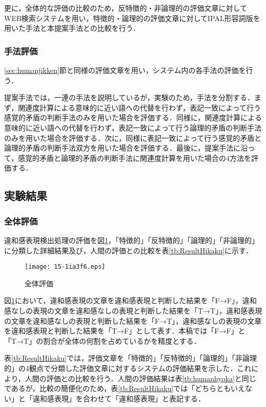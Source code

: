 \documentclass[japanese]{jnlp_1.4}
\begin{document}
更に，全体的な評価の比較のため，反特徴的・非論理的の評価文章に対してWEB検索システムを用い，特徴的・論理的の評価文章に対してIPAL形容詞版を用いた手法と本提案手法との比較を行う．

\subsubsection{手法評価}

\ref{sec:humanjikken}節と同様の評価文章を用い，システム内の各手法の評価を行う．

提案手法では，一連の手法を説明しているが，実験のため，手法を分割する．まず，関連度計算による意味的に近い語への代替を行わず，表記一致によって行う感覚的矛盾の判断手法のみを用いた場合を評価する．同様に，関連度計算による意味的に近い語への代替を行わず，表記一致によって行う論理的矛盾の判断手法のみを用いた場合を評価する．次に，同様に表記一致によって行う感覚的矛盾と論理的矛盾の判断手法双方を用いた場合を評価する．最後に，提案手法に沿って，感覚的矛盾と論理的矛盾の判断手法に関連度計算を用いた場合の4方法を評価する． 

\subsection{実験結果} \label{HyokaKekka}

\subsubsection{全体評価} \label{sec:allHyoka}

違和感表現検出処理の評価を図\ref{fig:Result}，「特徴的」「反特徴的」「論理的」「非論理的」に分類した詳細結果及び，人間の評価との比較を表\ref{tb:ResultHikaku}に示す．

\begin{figure}[b]
	\begin{center}
    \texttt{[image: 15-1ia3f6.eps]}
		\caption{全体評価}
		\label{fig:Result}
	\end{center}
\end{figure}

図\ref{fig:Result}において，違和感表現の文章を違和感表現と判断した結果を「F→F」，違和感なしの表現の文章を違和感なしの表現と判断した結果を「T→T」，違和感表現の文章を違和感なしの表現と判断した結果を「F→T」，違和感なしの表現の文章を違和感表現と判断した結果を「T→F」として表す．本稿では「F→F」と「T→T」の割合が全体の何割を占めているかを精度とする．

表\ref{tb:ResultHikaku}では，評価文章を「特徴的」「反特徴的」「論理的」「非論理的」の4観点で分類した評価文章に対するシステムの評価結果を示した．これにより，人間の評価との比較を行う．人間の評価結果は表\ref{tb:humanhyoka}と同じであるが，比較の簡便化のため，表\ref{tb:ResultHikaku}では「どちらともいえない」と「違和感表現」を合わせて「違和感表現」と表記する．
\end{document}
